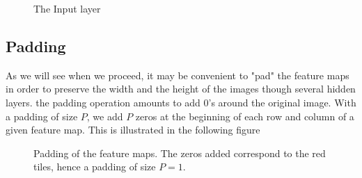 \begin{figure}[H]
\begin{center}
\caption{\label{fig:input_layer} The Input layer}
\end{center}
\end{figure}

\subsection{Padding}

As we will see when we proceed, it may be convenient to "pad" the feature maps in order to preserve the width and the height of the images though several hidden layers. the padding operation amounts to add $0$'s around the original image. With a padding of size $P$, we add $P$ zeros at the beginning of each row and column of a given feature map. This is illustrated in the following figure

\begin{figure}[H]
\begin{center}
\caption{Padding of the feature maps. The zeros added correspond to the red tiles, hence a padding of size $P=1$.}
\end{center}
\end{figure}

